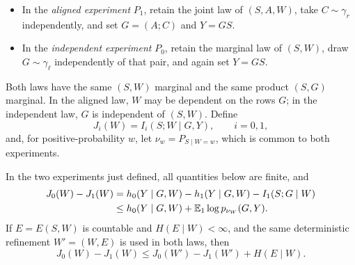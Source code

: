 \begin{itemize}
\item In the \emph{aligned experiment} \(P_1\), retain the joint law
of \((S,A,W)\), take \(C\sim\gamma_r\) independently, and set
\(G=(A;C)\) and \(Y=GS\).
\item In the \emph{independent experiment} \(P_0\), retain the
marginal law of \((S,W)\), draw \(G\sim\gamma_\ell\) independently
of that pair, and again set \(Y=GS\).
\end{itemize}

Both laws have the same \((S,W)\) marginal and the same product
\((S,G)\) marginal.  In the aligned law, \(W\) may be dependent on
the rows \(G\); in the independent law, \(G\) is independent of
\((S,W)\).  Define
\[
 J_i(W)=I_i(S;W\mid G,Y),\qquad i=0,1,
\]
and, for positive-probability \(w\), let
\(\nu_w=P_{S\mid W=w}\), which is common to both experiments.

\begin{proposition}
\label{prop:r-information-comparison}
In the two experiments just defined, all quantities below are finite,
and
\begin{align}
 J_0(W)-J_1(W)
 &=h_0(Y\mid G,W)-h_1(Y\mid G,W)-I_1(S;G\mid W)
 \label{eq:r-information-identity}\\
 &\le h_0(Y\mid G,W)+\mathbb E_1\log p_{\nu_W}(G,Y).
 \label{eq:r-information-density-bound}
\end{align}
If \(E=E(S,W)\) is countable and \(H(E\mid W)<\infty\), and the
same deterministic refinement \(W'=(W,E)\) is used in both laws,
then
\begin{equation}\label{eq:r-refinement-charge}
 J_0(W)-J_1(W)
 \le J_0(W')-J_1(W')+H(E\mid W).
\end{equation}
\end{proposition}

